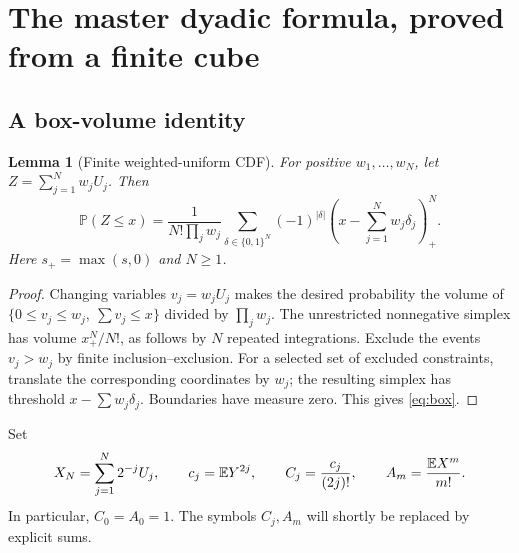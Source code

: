 \documentclass[11pt,oneside]{article}
\newtheorem{lemma}[theorem]{Lemma}
\theoremstyle{definition}\newtheorem{definition}[theorem]{Definition}
\theoremstyle{remark}\newtheorem{remark}[theorem]{Remark}
\newcommand{\Prob}{\mathbb P}\newcommand{\Up}{\operatorname{up}}
\begin{document}
\section{The master dyadic formula, proved from a finite cube}
\label{sec:master}

\subsection{A box-volume identity}
\begin{lemma}[Finite weighted-uniform CDF]
\label{lem:box}
For positive $w_1,\ldots,w_N$, let $Z=\sum_{j=1}^N w_jU_j$. Then
\begin{equation}
 \Prob(Z\le x)=\frac{1}{N!\prod_jw_j}
 \sum_{\delta\in\{0,1\}^N}(-1)^{|\delta|}
 \left(x-\sum_{j=1}^Nw_j\delta_j\right)_+^N.
 \label{eq:box}
\end{equation}
Here $s_+=\max(s,0)$ and $N\ge1$.
\end{lemma}
\begin{proof}
Changing variables $v_j=w_jU_j$ makes the desired probability the volume of
$\{0\le v_j\le w_j,\ \sum v_j\le x\}$ divided by $\prod_jw_j$.
The unrestricted nonnegative simplex has volume $x_+^N/N!$, as follows by
$N$ repeated integrations. Exclude the events $v_j>w_j$ by finite
inclusion--exclusion. For a selected set of excluded constraints, translate
the corresponding coordinates by $w_j$; the resulting simplex has threshold
$x-\sum w_j\delta_j$. Boundaries have measure zero. This gives
\eqref{eq:box}.
\end{proof}

Set
\begin{equation}
 X_N=\sum_{j=1}^N2^{-j}U_j,
 \qquad c_j=\mathbb E Y^{2j},\qquad C_j=\frac{c_j}{(2j)!},
 \qquad A_m=\frac{\mathbb E X^m}{m!}.
 \label{eq:moments}
\end{equation}
In particular, $C_0=A_0=1$. The symbols $C_j,A_m$ will shortly be replaced by
explicit sums.
\end{document}
